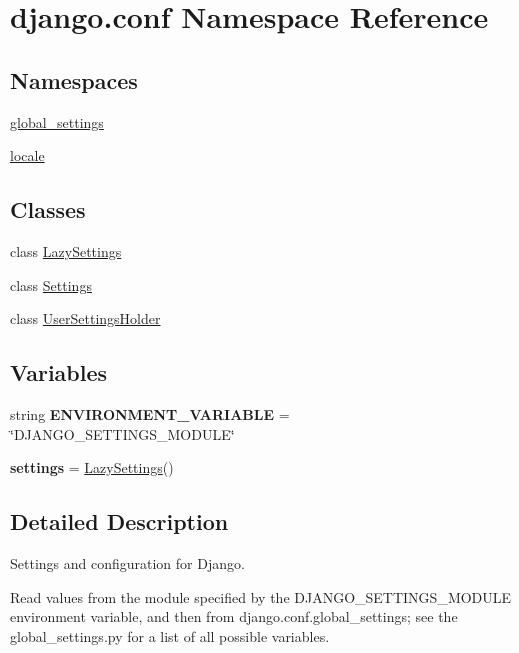 \hypertarget{namespacedjango_1_1conf}{}\section{django.\+conf Namespace Reference}
\label{namespacedjango_1_1conf}
\subsection*{Namespaces}
\begin{DoxyCompactItemize}
\item 
 \mbox{\hyperlink{namespacedjango_1_1conf_1_1global__settings}{global\+\_\+settings}}
\item 
 \mbox{\hyperlink{namespacedjango_1_1conf_1_1locale}{locale}}
\end{DoxyCompactItemize}
\subsection*{Classes}
\begin{DoxyCompactItemize}
\item 
class \mbox{\hyperlink{classdjango_1_1conf_1_1_lazy_settings}{Lazy\+Settings}}
\item 
class \mbox{\hyperlink{classdjango_1_1conf_1_1_settings}{Settings}}
\item 
class \mbox{\hyperlink{classdjango_1_1conf_1_1_user_settings_holder}{User\+Settings\+Holder}}
\end{DoxyCompactItemize}
\subsection*{Variables}
\begin{DoxyCompactItemize}
\item 
\mbox{\label{namespacedjango_1_1conf_a9330a42f5629bf83a5513d329b34f7ba}} 
string {\bfseries E\+N\+V\+I\+R\+O\+N\+M\+E\+N\+T\+\_\+\+V\+A\+R\+I\+A\+B\+LE} = \char`\"{}D\+J\+A\+N\+G\+O\+\_\+\+S\+E\+T\+T\+I\+N\+G\+S\+\_\+\+M\+O\+D\+U\+LE\char`\"{}
\item 
\mbox{\label{namespacedjango_1_1conf_ad298cae31777b94d5ad3dddf7d2d0f37}} 
{\bfseries settings} = \mbox{\hyperlink{classdjango_1_1conf_1_1_lazy_settings}{Lazy\+Settings}}()
\end{DoxyCompactItemize}


\subsection{Detailed Description}
\begin{DoxyVerb}Settings and configuration for Django.

Read values from the module specified by the DJANGO_SETTINGS_MODULE environment
variable, and then from django.conf.global_settings; see the global_settings.py
for a list of all possible variables.
\end{DoxyVerb}
 